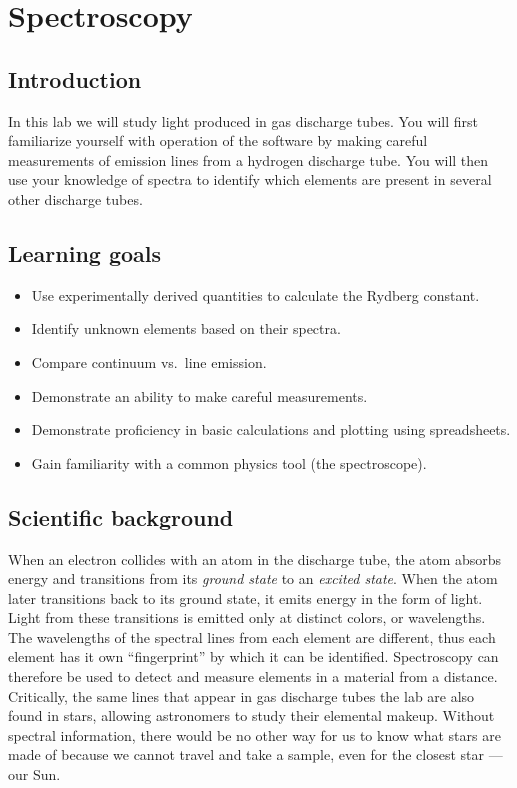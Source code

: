 \chapter{Spectroscopy}

\section{Introduction}

In this lab we will study light produced in gas discharge tubes.
You will first familiarize yourself with operation of the software by making careful measurements of emission lines from a hydrogen discharge tube.
You will then use your knowledge of spectra to identify which elements are present in several other discharge tubes.

\section{Learning goals}

\begin{itemize}
	\item Use experimentally derived quantities to calculate the Rydberg constant.
	\item Identify unknown elements based on their spectra.
	\item Compare continuum vs.\ line emission.
	\item Demonstrate an ability to make careful measurements.
	\item Demonstrate proficiency in basic calculations and plotting using spreadsheets.
	\item Gain familiarity with a common physics tool (the spectroscope).
\end{itemize}

\section{Scientific background}

When an electron collides with an atom in the discharge tube, the atom absorbs energy and transitions from its \textit{ground state} to an \textit{excited state}.
When the atom later transitions back to its ground state, it emits energy in the form of light.
Light from these transitions is emitted only at distinct colors, or wavelengths.
The wavelengths of the spectral lines from each element are different, thus each element has it own ``fingerprint'' by which it can be identified.
Spectroscopy can therefore be used to detect and measure elements in a material from a distance.
Critically, the same lines that appear in gas discharge tubes the lab are also found in stars, allowing astronomers to study their elemental makeup.
Without spectral information, there would be no other way for us to know what stars are made of because we cannot travel and take a sample, even for the closest star --- our Sun.

